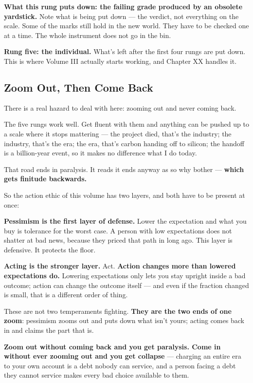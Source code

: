 \documentclass[11pt,a4paper]{article}
\begin{document}
\textbf{What this rung puts down: the failing grade produced by an obsolete yardstick.} Note what is being put down --- the verdict, not everything on the scale. Some of the marks still hold in the new world. They have to be checked one at a time. The whole instrument does not go in the bin.

\textbf{Rung five: the individual.} What's left after the first four rungs are put down. This is where Volume III actually starts working, and Chapter XX handles it.

\subsection{Zoom Out, Then Come Back}

There is a real hazard to deal with here: zooming out and never coming back.

The five rungs work well. Get fluent with them and anything can be pushed up to a scale where it stops mattering --- the project died, that's the industry; the industry, that's the era; the era, that's carbon handing off to silicon; the handoff is a billion-year event, so it makes no difference what I do today.

That road ends in paralysis. It reads it ends anyway as so why bother --- \textbf{which gets finitude backwards.}

So the action ethic of this volume has two layers, and both have to be present at once:

\textbf{Pessimism is the first layer of defense.} Lower the expectation and what you buy is tolerance for the worst case. A person with low expectations does not shatter at bad news, because they priced that path in long ago. This layer is defensive. It protects the floor.

\textbf{Acting is the stronger layer.} Act. \textbf{Action changes more than lowered expectations do.} Lowering expectations only lets you stay upright inside a bad outcome; action can change the outcome itself --- and even if the fraction changed is small, that is a different order of thing.

These are not two temperaments fighting. \textbf{They are the two ends of one zoom}: pessimism zooms out and puts down what isn't yours; acting comes back in and claims the part that is.

\textbf{Zoom out without coming back and you get paralysis. Come in without ever zooming out and you get collapse} --- charging an entire era to your own account is a debt nobody can service, and a person facing a debt they cannot service makes every bad choice available to them.
\end{document}
